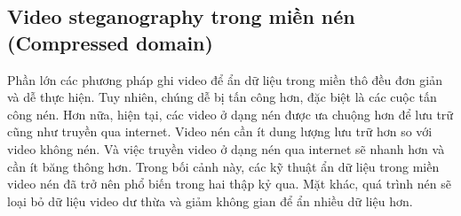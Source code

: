 \begin{table}[!h]
\centering
\caption{Các nghiên cứu sử dụng phương pháp DCT và DWT} 
\label{tab:DCT_DWT_survey}
\end{table}

\subsection{Video steganography trong miền nén (Compressed domain)}
Phần lớn các phương pháp ghi video để ẩn dữ liệu trong miền thô đều đơn giản và dễ thực hiện. Tuy nhiên, chúng dễ bị tấn công hơn, đặc biệt là các cuộc tấn công nén. Hơn nữa, hiện tại, các video ở dạng nén được ưa chuộng hơn để lưu trữ cũng như truyền qua internet. Video nén cần ít dung lượng lưu trữ hơn so với video không nén. Và việc truyền video ở dạng nén qua internet sẽ nhanh hơn và cần ít băng thông hơn. Trong bối cảnh này, các kỹ thuật ẩn dữ liệu trong miền video nén đã trở nên phổ biến trong hai thập kỷ qua. Mặt khác, quá trình nén sẽ loại bỏ dữ liệu video dư thừa và giảm không gian để ẩn nhiều dữ liệu hơn.

